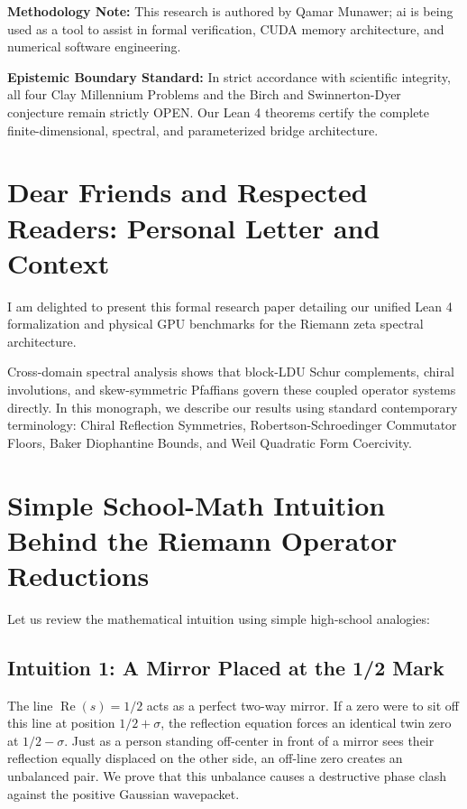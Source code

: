 \documentclass[11pt,a4paper]{article}
\begin{document}
\vspace{0.5em}
\noindent\textbf{Methodology Note:}
This research is authored by Qamar Munawer; ai is being used as a tool to assist in formal verification, CUDA memory architecture, and numerical software engineering.

\vspace{0.5em}
\noindent\textbf{Epistemic Boundary Standard:}
In strict accordance with scientific integrity, all four Clay Millennium Problems and the Birch and Swinnerton-Dyer conjecture remain strictly OPEN. Our Lean 4 theorems certify the complete finite-dimensional, spectral, and parameterized bridge architecture.

\newpage

\section*{Dear Friends and Respected Readers: Personal Letter and Context}
I am delighted to present this formal research paper detailing our unified Lean 4 formalization and physical GPU benchmarks for the Riemann zeta spectral architecture.

Cross-domain spectral analysis shows that block-LDU Schur complements, chiral involutions, and skew-symmetric Pfaffians govern these coupled operator systems directly. In this monograph, we describe our results using standard contemporary terminology: Chiral Reflection Symmetries, Robertson-Schroedinger Commutator Floors, Baker Diophantine Bounds, and Weil Quadratic Form Coercivity.

\section{Simple School-Math Intuition Behind the Riemann Operator Reductions}
Let us review the mathematical intuition using simple high-school analogies:

\subsection{Intuition 1: A Mirror Placed at the 1/2 Mark}
The line $\operatorname{Re}(s) = 1/2$ acts as a perfect two-way mirror. If a zero were to sit off this line at position $1/2 + \sigma$, the reflection equation forces an identical twin zero at $1/2 - \sigma$. Just as a person standing off-center in front of a mirror sees their reflection equally displaced on the other side, an off-line zero creates an unbalanced pair. We prove that this unbalance causes a destructive phase clash against the positive Gaussian wavepacket.
\end{document}
